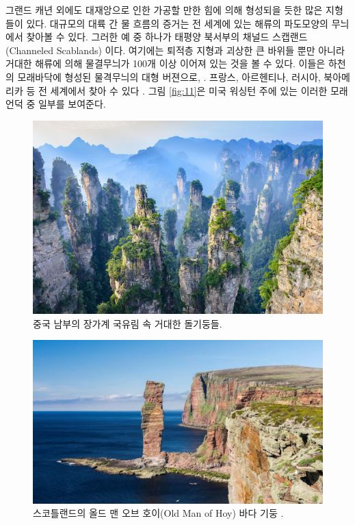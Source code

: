 \documentclass[10pt,twocolumn,letterpaper]{article}
\begin{document}
그랜드 캐년 외에도 대재앙으로 인한 가공할 만한 힘에 의해 형성되을 듯한 많은 지형들이 있다. 대규모의 대륙 간 물 흐름의 증거는 전 세계에 있는 해류의 파도모양의 무늬에서 찾아볼 수 있다. 그러한 예 중 하나가 태평양 북서부의 채널드 스캡랜드(Channeled Scablands) 이다. 여기에는 퇴적층 지형과 괴상한  큰 바위들 뿐만 아니라  거대한 해류에 의해 물결무늬가 100개 이상 이어져 있는 것을 볼 수 있다. 이들은 하천의 모래바닥에 형성된 물격무늬의 대형 버젼으로, \cite{78,79}.  프랑스, 아르헨티나, 러시아, 북아메리카 등 전 세계에서 찾아 수 있다 \cite{81}. 그림 \ref{fig:11}은 미국 워싱턴 주에 있는 이러한 모래 언덕 중 일부를 보여준다\cite{80}.

\begin{figure}[t]
\begin{center}
   \includegraphics[width=1\linewidth]{zhangjiajie.jpg}
\end{center}
   \caption{중국 남부의  장가계 국유림 속 거대한 돌기둥들.}
\label{fig:12}
\label{fig:onecol}
\end{figure}

\begin{figure}[t]
\begin{center}
   \includegraphics[width=1\linewidth]{hoy.jpg}
\end{center}
   \caption{스코틀랜드의 올드 맨 오브 호이(Old Man of Hoy) 바다 기둥 \cite{83}.}
\label{fig:13}
\label{fig:onecol}
\end{figure}
\end{document}
